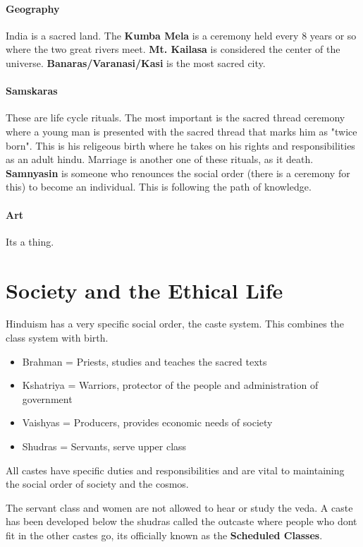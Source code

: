 \documentclass{article}
\begin{document}
\paragraph{Geography}
\label{par:geography}
India is a sacred land. The \textbf{Kumba Mela} is a ceremony held every 8 years or so where the two great rivers meet. \textbf{Mt. Kailasa} is considered the center of the universe. \textbf{Banaras/Varanasi/Kasi} is the most sacred city.

\paragraph{Samskaras}
\label{par:samskaras}
These are life cycle rituals. The most important is the sacred thread ceremony where a young man is presented with the sacred thread that marks him as "twice born". This is his religeous birth where he takes on his rights and responsibilities as an adult hindu. Marriage is another one of these rituals, as it death. \textbf{Samnyasin} is someone who renounces the social order (there is a ceremony for this) to become an individual. This is following the path of knowledge.

\paragraph{Art}
\label{par:art}
Its a thing.

\section*{Society and the Ethical Life}
\label{sec:society_and_the_ethical_life}
Hinduism has a very specific social order, the caste system. This combines the class system with birth.

\begin{itemize}
	\item Brahman = Priests, studies and teaches the sacred texts
	\item Kshatriya = Warriors, protector of the people and administration of government
	\item Vaishyas = Producers, provides economic needs of society
	\item Shudras = Servants, serve upper class
\end{itemize}

All castes have specific duties and responsibilities and are vital to maintaining the social order of society and the cosmos.

The servant class and women are not allowed to hear or study the veda. A caste has been developed below the shudras called the outcaste where people who dont fit in the other castes go, its officially known as the \textbf{Scheduled Classes}.
\end{document}
